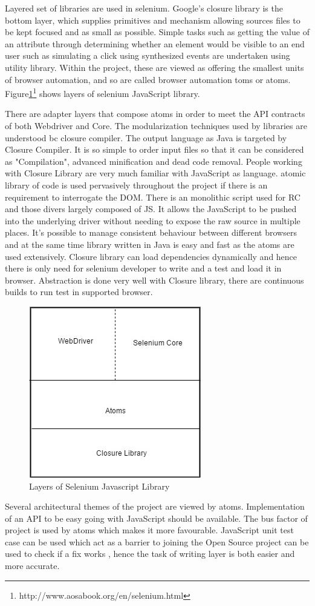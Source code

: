 \documentclass[article,type=msc,colorback,accentcolor=tud9c,twoside,11pt]{tudthesis}
\begin{document}
Layered set of libraries are used in selenium. Google's closure library is the bottom layer, which supplies primitives and mechanism allowing sources files to be kept focused and as small as possible. Simple tasks such as getting the value of an attribute through determining whether an element would be visible to an end user such as simulating a click using synthesized events are undertaken using utility library. Within the project, these are viewed as offering the smallest units of browser automation, and so are called browser automation toms or atoms. 
 Figure\ref{fig:LayersofSeleniumJSLibrary}\footnote{http://www.aosabook.org/en/selenium.html} shows layers of selenium JavaScript library.

There are adapter layers that compose atoms in order to meet the API contracts of both Webdriver and Core. The modularization techniques used by libraries are understood bc closure compiler. The output language as Java is targeted by Closure Compiler. It is so simple to order input files so that it can be considered as "Compilation", advanced minification and dead code removal. People working with Closure Library are very much familiar with JavaScript as language. atomic library of code is used pervasively throughout the project if there is an requirement to interrogate the DOM. There is an monolithic script used for RC and those divers largely composed of JS. It allows the JavaScript to be pushed into the underlying driver without needing to expose the raw source in multiple places. It's possible to manage consistent behaviour between different browsers and at the same time library written in Java is easy and fast as the atoms are used extensively. Closure library can load dependencies dynamically and hence there is only need for selenium developer to write and a test and load it in browser. Abstraction is done very well with Closure library, there are continuous builds to run test in supported browser.
\begin{figure}[h]
	\centering
	\includegraphics[scale=0.6]{LayersofSeleniumJSLibrary}
	\caption{Layers of Selenium Javascript Library}
	\label{fig:LayersofSeleniumJSLibrary}
\end{figure}
Several architectural themes of the project are viewed by atoms. Implementation of an API to be easy going with JavaScript should be available. The bus factor of project is used by atoms which makes it more favourable. JavaScript unit test case can be used which act as a barrier to joining the Open Source project can be used to check if a fix works , hence the task of writing layer is both easier and more accurate.
\end{document}

